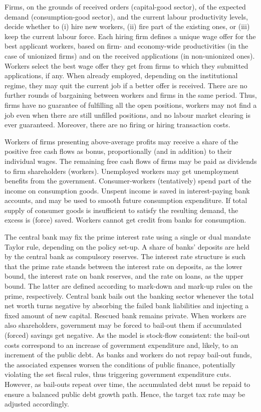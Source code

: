 \documentclass[a4paper,11pt]{article}
\begin{document}
Firms, on the grounds of received orders (capital-good sector), of the expected demand (consumption-good sector), and the current labour productivity levels, decide whether to (i) hire new workers, (ii) fire part of the existing ones, or (iii) keep the current labour force. Each hiring firm defines a unique wage offer for the best applicant workers, based on firm- and economy-wide productivities (in the case of unionized firms) and on the received applications (in non-unionized ones). Workers select the best wage offer they get from firms to which they submitted applications, if any. When already employed, depending on the institutional regime, they may quit the current job if a better offer is received. There are no further rounds of bargaining between workers and firms in the same period. Thus, firms have no guarantee of fulfilling all the open positions, workers may not find a job even when there are still unfilled positions, and no labour market clearing is ever guaranteed. Moreover, there are no firing or hiring transaction costs.

Workers of firms presenting above-average profits may receive a share of the positive free cash flows as bonus, proportionally (and in addition) to their individual wages. The remaining free cash flows of firms may be paid as dividends to firm shareholders (workers). Unemployed workers may get unemployment benefits from the government. Consumer-workers (tentatively) spend part of the income on consumption goods. Unspent income is saved in interest-paying bank accounts, and may be used to smooth future consumption expenditure. If total supply of consumer goods is insufficient to satisfy the resulting demand, the excess is (force) saved. Workers cannot get credit from banks for consumption.

The central bank may fix the prime interest rate using a single or dual mandate Taylor rule, depending on the policy set-up. A share of banks' deposits are held by the central bank as compulsory reserves. The interest rate structure is such that the prime rate stands between the interest rate on deposits, as the lower bound, the interest rate on bank reserves, and the rate on loans, as the upper bound. The latter are defined according to mark-down and mark-up rules on the prime, respectively. Central bank bails out the banking sector whenever the total net worth turns negative by absorbing the failed bank liabilities and injecting a fixed amount of new capital. Rescued bank remains private. When workers are also shareholders, government may be forced to bail-out them if accumulated (forced) savings get negative. As the model is stock-flow consistent: the bail-out costs correspond to an increase of government expenditure and, likely, to an increment of the public debt. As banks and workers do not repay bail-out funds, the associated expenses worsen the conditions of public finance, potentially violating the set fiscal rules, thus triggering government expenditure cuts. However, as bail-outs repeat over time, the accumulated debt must be repaid to ensure a balanced public debt growth path. Hence, the target tax rate may be adjusted accordingly.
\end{document}
